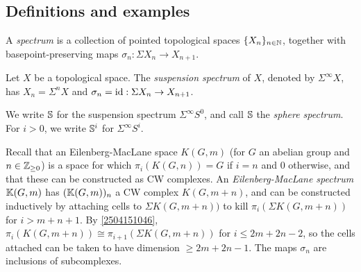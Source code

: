 \documentclass{MetricNotes2023}
\def\bb{\ensuremath\mathbb}
\def\inte{\ensuremath\mathbb{Z}}
\def\nat{\ensuremath\mathbb{N}}
\def\id{\ensuremath\text{id}}
\begin{document}
\subsection{Definitions and examples}\label{2504291244}


\begin{definition}
A \textit{spectrum} is a collection of pointed topological spaces \(\{X_n\}_{n\in \nat}\), together with basepoint-preserving maps \(\sigma_n : \Sigma X_n \to X_{n+1}\).
\end{definition}

\begin{example}
Let \(X\) be a topological space. The \textit{suspension spectrum} of \(X\), denoted by \(\Sigma^\infty X\), has \(X_n=\Sigma^nX\) and \(\sigma_n=\id : \Sigma X_n \to X_{n+1}\).
\end{example}

We write \(\bb{S}\) for the suspension spectrum \(\Sigma^\infty S^0\), and call \(\bb{S}\) the \textit{sphere spectrum}. For \(i>0\), we write \(\bb{S}^i\) for \(\Sigma^\infty S^i\).%



\begin{example}\label{2504251659}
Recall that an Eilenberg-MacLane space \(K(G, m)\) (for \(G\) an abelian group and \(n \in \inte_{\geq 0}\)) is a space for which \(\pi_i(K(G, n))=G\) if \(i=n\) and \(0\) otherwise, and that these can be constructed as CW complexes. An \textit{Eilenberg-MacLane spectrum} \(\bb{K}(G,m)\) has \((\bb{K}(G,m))_n\) a CW complex \(K(G,m+n)\), and can be constructed inductively by attaching cells to \(\Sigma K(G, m+n))\) to kill \(\pi_i(\Sigma K(G, m+n))\) for \(i > m+n+1\). By \ref{2504151046}, \(\pi_i(K(G, m+n))\cong \pi_{i+1}(\Sigma K(G, m+n))\) for \(i \leq 2m+2n-2\), so the cells attached can be taken to have dimension \(\geq 2m+2n-1\). The maps \(\sigma_n\) are inclusions of subcomplexes. 
\end{example}
\end{document}

